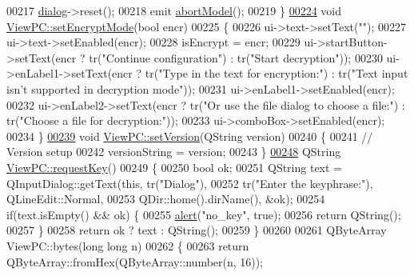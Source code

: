 \begin{DoxyCode}
00217     \hyperlink{class_view_p_c_a31abbb470fe329b44e6ffee202b903ca}{dialog}->reset();
00218     emit \hyperlink{class_view_p_c_aa652102ce6b5757b8eef830409c8cabf}{abortModel}();
00219 \}
\hypertarget{viewpc_8cpp_source.tex_l00224}{}\hyperlink{class_view_p_c_a5b48951efefdc0e3039c9a4bf185320b}{00224} \textcolor{keywordtype}{void} \hyperlink{class_view_p_c_a5b48951efefdc0e3039c9a4bf185320b}{ViewPC::setEncryptMode}(\textcolor{keywordtype}{bool} encr)
00225 \{
00226     ui->text->setText(\textcolor{stringliteral}{""});
00227     ui->text->setEnabled(encr);
00228     isEncrypt = encr;
00229     ui->startButton->setText(encr ? tr(\textcolor{stringliteral}{"Continue configuration"}) : tr(\textcolor{stringliteral}{"Start decryption"}));
00230     ui->enLabel1->setText(encr ? tr(\textcolor{stringliteral}{"Type in the text for encryption:"}) : tr(\textcolor{stringliteral}{"Text input isn't supported in
       decryption mode"}));
00231     ui->enLabel1->setEnabled(encr);
00232     ui->enLabel2->setText(encr ? tr(\textcolor{stringliteral}{"Or use the file dialog to choose a file:"}) : tr(\textcolor{stringliteral}{"Choose a file for
       decryption:"}));
00233     ui->comboBox->setEnabled(encr);
00234 \}
\hypertarget{viewpc_8cpp_source.tex_l00239}{}\hyperlink{class_view_p_c_ac05220df875b7c4f24405a5742476ebf}{00239} \textcolor{keywordtype}{void} \hyperlink{class_view_p_c_ac05220df875b7c4f24405a5742476ebf}{ViewPC::setVersion}(QString version)
00240 \{
00241     \textcolor{comment}{// Version setup}
00242     versionString = version;
00243 \}
\hypertarget{viewpc_8cpp_source.tex_l00248}{}\hyperlink{class_view_p_c_a559c95675ec98b15451f3bca47033d9c}{00248} QString \hyperlink{class_view_p_c_a559c95675ec98b15451f3bca47033d9c}{ViewPC::requestKey}()
00249 \{
00250     \textcolor{keywordtype}{bool} ok;
00251     QString text = QInputDialog::getText(\textcolor{keyword}{this}, tr(\textcolor{stringliteral}{"Dialog"}),
00252                                          tr(\textcolor{stringliteral}{"Enter the keyphrase:"}), QLineEdit::Normal,
00253                                          QDir::home().dirName(), &ok);
00254     \textcolor{keywordflow}{if}(text.isEmpty() && ok) \{
00255         \hyperlink{class_view_p_c_a7c467169467789561078abc9d4fe57bd}{alert}(\textcolor{stringliteral}{"no\_key"}, \textcolor{keyword}{true});
00256         \textcolor{keywordflow}{return} QString();
00257     \}
00258     \textcolor{keywordflow}{return} ok ? text : QString();
00259 \}
00260 
00261 QByteArray ViewPC::bytes(\textcolor{keywordtype}{long} \textcolor{keywordtype}{long} n)
00262 \{
00263     \textcolor{keywordflow}{return} QByteArray::fromHex(QByteArray::number(n, 16));

\end{DoxyCode}
